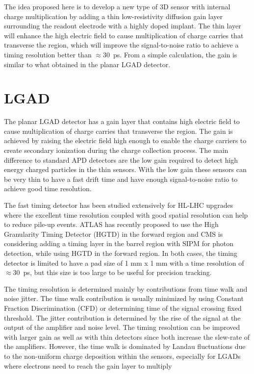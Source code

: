 \documentclass[aps,pt14,superscriptaddress,showpacs,floatfix,nofootinbib]{revtex4}
\begin{document}
The idea proposed here is to develop a new type of 3D sensor with internal
charge multiplication by adding a thin low-resistivity diffusion gain layer surrounding
the readout electrode with a highly doped implant.
The thin layer will enhance the high electric field to cause multiplication of
charge carries that transverse the region, which will improve the signal-to-noise ratio to
achieve a timing resolution better than $\approx$30~ps.
From a simple calculation, the gain is similar to what obtained
in the planar LGAD detector.

\section{LGAD}

The planar LGAD detector has a gain layer that contains high electric field to
cause multiplication of charge carries that transverse the region.
The gain is achieved by raising the electric field high enough to enable the
charge carriers to create secondary ionization during the charge collection process.
The main difference to standard APD detectors are the low gain
required to detect high energy charged particles in the thin sensors.
With the low gain these sensors can be very thin to have a fast drift time
and have enough signal-to-noise ratio to achieve good time resolution.

The fast timing detector has been studied extensively for HL-LHC upgrades where the
excellent time resolution coupled with good spatial resolution can help to
reduce pile-up events. ATLAS has recently proposed to use the High Granularity
Timing Detector (HGTD) in the forward region and CMS is considering adding
a timing layer in the barrel region with SIPM for photon detection, while using HGTD
in the forward region. In both cases, the timing detector is 
limited to have a pad size of 1 mm x 1 mm with a time resolution of $\approx$30~ps, but this 
size is too large to be useful for precision tracking.

The timing resolution is determined mainly by contributions from time walk and noise
jitter. The time walk contribution is usually minimized by using Constant Fraction
Discrimination (CFD) or determining time of the signal crossing fixed threshold.
The jitter contribution is determined by the rise of the signal at the output of
the amplifier and noise level. The timing resolution can be improved with larger
gain as well as with thin detectors since both increase the slew-rate of the amplifiers.
However, the time walk is dominated by Landau fluctuations due to
the non-uniform charge deposition within the sensors, especially for LGADs where
electrons need to reach the gain layer to multiply
\end{document}
